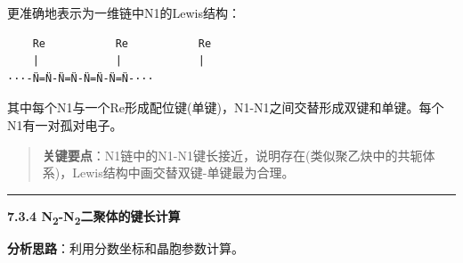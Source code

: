 \documentclass[a4paper,11pt]{ctexart}
\newcommand{\箭}{\ensuremath{\rightarrow}}
\newcommand{\左箭}{\ensuremath{\leftarrow}}
\newcommand{\上箭}{\ensuremath{\uparrow}}
\newcommand{\下箭}{\ensuremath{\downarrow}}
\newcommand{\衡}{\ensuremath{\rightleftharpoons}}
\newcommand{\双箭}{\ensuremath{\leftrightarrow}}
\newcommand{\约等于}{\ensuremath{\approx}}
\newcommand{\小于等于}{\ensuremath{\leq}}
\newcommand{\大于等于}{\ensuremath{\geq}}
\newcommand{\不等于}{\ensuremath{\neq}}
\newcommand{\西格马}{\ensuremath{\sigma}}
\newcommand{\派}{\ensuremath{\pi}}
\begin{document}
更准确地表示为一维链中N1的Lewis结构：

\begin{verbatim}
    Re           Re           Re
    |            |            |
···-N̈=N̈-N̈=N̈-N̈=N̈-N̈=N̈-···
\end{verbatim}

其中每个N1与一个Re形成配位键(单键)，N1-N1之间交替形成双键和单键。每个N1有一对孤对电子。

\begin{quote}
\textbf{关键要点}：N1链中的N1-N1键长接近，说明存在(类似聚乙炔中的共轭体系)，Lewis结构中画交替双键-单键最为合理。
\end{quote}

\begin{center}\rule{0.5\linewidth}{0.5pt}\end{center}

\textbf{7.3.4 N\textsubscript{2}-N\textsubscript{2}二聚体的键长计算}

\textbf{分析思路}：利用分数坐标和晶胞参数计算。
\end{document}
